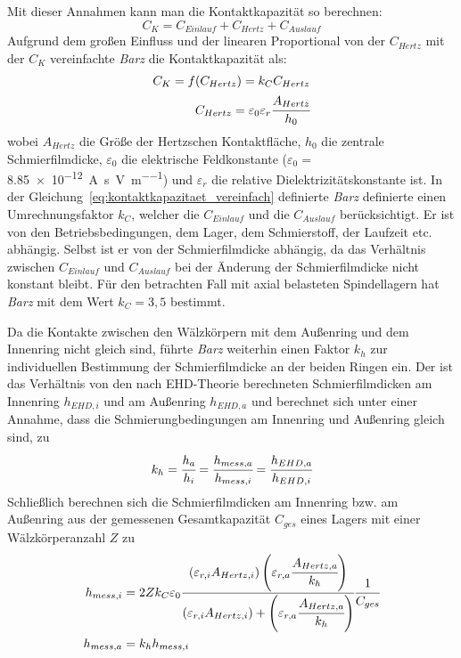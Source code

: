 Mit dieser Annahmen kann man die Kontaktkapazität so berechnen:
%
\begin{equation}
    C_K = C_{Einlauf} + C_{Hertz} + C_{Auslauf}
    \label{eq:kontaktkapazitaet}
\end{equation}
%
Aufgrund dem großen Einfluss und der linearen Proportional von der $C_{Hertz}$ mit der $C_K$ vereinfachte \textit{Barz} die Kontaktkapazität als:
%
\begin{align}
    C_K = f(C_{Hertz}) = k_C C_{Hertz} \\
    C_{Hertz} = \varepsilon_0 \varepsilon_r \cfrac{A_{Hertz}}{h_0}
    \label{eq:kontaktkapazitaet_vereinfach}
\end{align}
%
wobei $A_{Hertz}$ die Größe der Hertzschen Kontaktfläche, $h_0$ die zentrale Schmierfilmdicke, $\varepsilon_0$ die elektrische Feldkonstante ($\varepsilon_0 =$ \SI[bracket-unit-denominator=false, per-mode=symbol]{8,85e-12}{\ampere\second\per\volt\per\meter}) und $\varepsilon_r$ die relative Dielektrizitätskonstante ist.
In der Gleichung~\ref{eq:kontaktkapazitaet_vereinfach} definierte \textit{Barz} definierte einen Umrechnungsfaktor $k_C$, welcher die $C_{Einlauf}$ und die $C_{Auslauf}$ berücksichtigt.
Er ist von den Betriebsbedingungen, dem Lager, dem Schmierstoff, der Laufzeit etc. abhängig.
Selbst ist er von der Schmierfilmdicke abhängig, da das Verhältnis zwischen $C_{Einlauf}$ und $C_{Auslauf}$ bei der Änderung der Schmierfilmdicke nicht konstant bleibt.
Für den betrachten Fall mit axial belasteten Spindellagern hat \textit{Barz} mit dem Wert $k_C = 3,5$ bestimmt.

Da die Kontakte zwischen den Wälzkörpern mit dem Außenring und dem Innenring nicht gleich sind, führte \textit{Barz} weiterhin einen Faktor $k_h$ zur individuellen Bestimmung der Schmierfilmdicke an der beiden Ringen ein.
Der ist das Verhältnis von den nach EHD-Theorie berechneten Schmierfilmdicken am Innenring $h_{EHD,i}$ und am Außenring $h_{EHD,a}$ und berechnet sich unter einer Annahme, dass die Schmierungbedingungen am Innenring und Außenring gleich sind, zu
%
\begin{equation}
    k_h = \cfrac{h_a}{h_i} = \cfrac{h_{mess,a}}{h_{mess,i}} = \cfrac{h_{EHD,a}}{h_{EHD,i}}
    \label{eq:kh_faktor}
\end{equation}
%
Schließlich berechnen sich die Schmierfilmdicken am Innenring bzw. am Außenring aus der gemessenen Gesamtkapazität $C_{ges}$ eines Lagers mit einer Wälzkörperanzahl $Z$ zu
%
\begin{align}
    h_{mess,i} &= 2 Z k_C \varepsilon_0 
                \cfrac{(\varepsilon_{r,i} A_{Hertz,i}) \left( \varepsilon_{r,a} \cfrac{A_{Hertz,a}}{k_h} \right) }
                      {(\varepsilon_{r,i} A_{Hertz,i}) + \left( \varepsilon_{r,a} \cfrac{A_{Hertz,a}}{k_h} \right) }
                \cfrac{1}{C_{ges}} \\
    h_{mess,a} &= k_h h_{mess,i}
\end{align}
%


